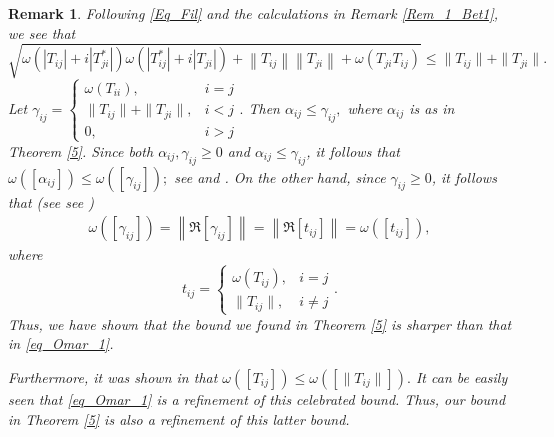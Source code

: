 \documentclass[12pt,twoside,reqno]{amsart}
\newtheorem{remark}{Remark}[section]
\numberwithin{equation}{section}
\begin{document}
\begin{remark}
Following \eqref{Eq_Fil} and the calculations in Remark \ref{Rem_1_Bet1}, we see that
\[\sqrt{\omega \left( \left| {{T}_{ij}} \right|+i\left| T_{ji}^{*} \right| \right)\omega \left( \left| T_{ij}^{*} \right|+i\left| {{T}_{ji}} \right| \right)+\left\| {{T}_{ij}} \right\|\left\| {{T}_{ji}} \right\|+\omega \left( {{T}_{ji}}{{T}_{ij}} \right)}\leq \|T_{ij}\|+\|T_{ji}\|.\]
Let $\gamma_{ij}=\left\{\begin{array}{cc}\omega(T_{ii}),&i=j\\\|T_{ij}\|+\|T_{ji}\|,&i<j\\0,&i>j\end{array}\right..$ Then $\alpha_{ij}\leq \gamma_{ij},$ where $\alpha_{ij}$ is as in Theorem \ref{5}. Since both $\alpha_{ij},\gamma_{ij}\geq 0$ and $\alpha_{ij}\leq \gamma_{ij}$, it follows that $\omega([\alpha_{ij}])\leq \omega([\gamma_{ij}]);$ see \cite{Goldberg_LAA_1975} and \cite[Corollary 2.1]{Turman_RIM_2025}. On the other hand, since $\gamma_{ij}\geq 0$, it follows that (see see \cite{Goldberg_LAA_1975,Turman_RIM_2025})
\begin{align*}
\omega([\gamma_{ij}])=\left\|\Re[\gamma_{ij}]\right\|=\left\|\Re[t_{ij}]\right\|=\omega([t_{ij}]),
\end{align*}
where \[ t_{ij}=\left\{%
\begin{array}{cc}
\omega(T_{ij}), & i=j \\ 
\|T_{ij}\|, & i\not=j%
\end{array}%
\right..\]
Thus, we have shown that the bound we found in Theorem \ref{5} is sharper than that in \eqref{eq_Omar_1}.

Furthermore, it was shown in \cite{Hou_IEOT_1995} that $\omega([T_{ij}])\leq\omega([\|T_{ij}\|]).$ It can be easily seen that \eqref{eq_Omar_1} is a refinement of this celebrated bound. Thus, our bound in Theorem \ref{5} is also a refinement of this latter bound.
\end{remark}
\end{document}
